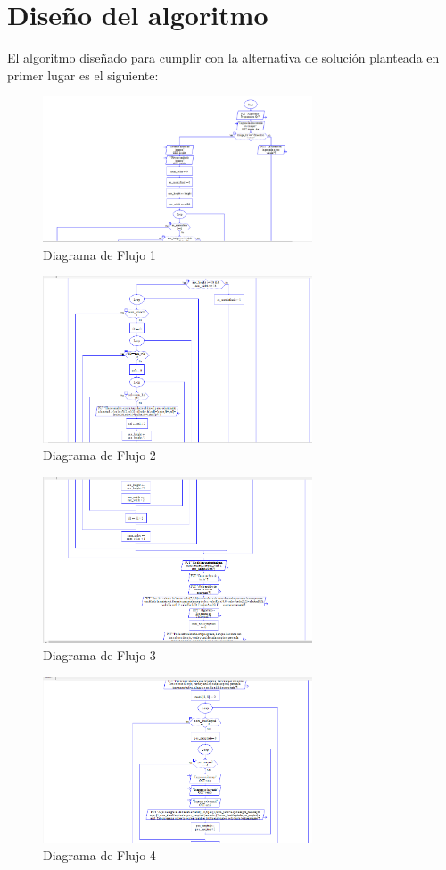 \documentclass{article}
\begin{document}
 \section{Diseño del algoritmo}
 El algoritmo diseñado para cumplir con la alternativa de solución planteada en primer lugar es el siguiente:
  \begin{figure}[h]
    \includegraphics[width=8cm]{flow_1.png}
    \centering
    \caption{Diagrama de Flujo 1}
    \label{fig:flow_1}
 \end{figure}
  \begin{figure}[h]
    \includegraphics[width=8cm]{flow_2.png}
    \centering
    \caption{Diagrama de Flujo 2}
    \label{fig:flow_2}
 \end{figure}
  \begin{figure}[h]
    \includegraphics[width=8cm]{flow_3.png}
    \centering
    \caption{Diagrama de Flujo 3}
    \label{fig:flow_3}
 \end{figure}
  \begin{figure}[h]
    \includegraphics[width=8cm]{flow_4.png}
    \centering
    \caption{Diagrama de Flujo 4}
    \label{fig:flow_4}
 \end{figure}
\end{document}
